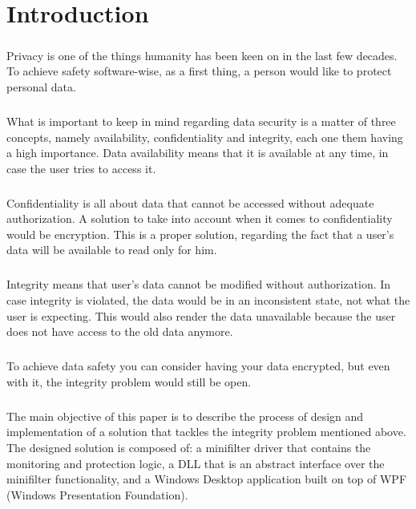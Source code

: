 \chapter{Introduction}
	\paragraph{}
	Privacy is one of the things humanity has been keen on in the last few decades. To achieve safety software-wise, as a first thing, a person would like to protect personal data. 
	
	\paragraph{}
	What is important to keep in mind regarding data security is a matter of three concepts, namely availability, confidentiality and integrity, each one them having a high importance. Data availability means that it is available at any time, in case the user tries to access it.
	
	\paragraph{}
	Confidentiality is all about data that cannot be accessed without adequate authorization. A solution to take into account when it comes to confidentiality would be encryption. This is a proper solution, regarding the fact that a user's data will be available to read only for him.
	
	\paragraph{}
	Integrity means that user's data cannot be modified without authorization. In case integrity is violated, the data would be in an inconsistent state, not what the user is expecting. This would also render the data unavailable because the user does not have access to the old data anymore.
	
	\paragraph{}
	To achieve data safety you can consider having your data encrypted, but even with it, the integrity problem would still be open.   
	
	\paragraph{}
	The main objective of this paper is to describe the process of design and implementation of a solution that tackles the integrity problem mentioned above. The designed solution is composed of: a minifilter driver that contains the monitoring and protection logic, a DLL that is an abstract interface over the minifilter functionality, and a Windows Desktop application built on top of WPF (Windows Presentation Foundation). 
	

